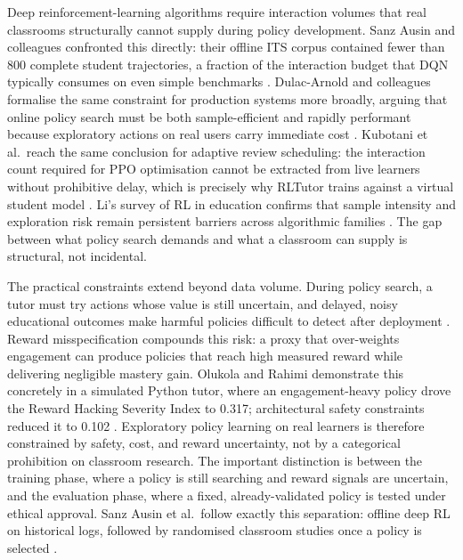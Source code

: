 Deep reinforcement-learning algorithms require interaction volumes that real classrooms structurally cannot supply during policy development. Sanz Ausin and colleagues confronted this directly: their offline \ac{ITS} corpus contained fewer than 800 complete student trajectories, a fraction of the interaction budget that \ac{DQN} typically consumes on even simple benchmarks \cite{sanz_ausin_leveraging_2019}. Dulac-Arnold and colleagues formalise the same constraint for production systems more broadly, arguing that online policy search must be both sample-efficient and rapidly performant because exploratory actions on real users carry immediate cost \cite{dulacarnold_challenges_2021}. Kubotani et al.\ reach the same conclusion for adaptive review scheduling: the interaction count required for \ac{PPO} optimisation cannot be extracted from live learners without prohibitive delay, which is precisely why RLTutor trains against a virtual student model \cite{kubotani_rltutor_2021}. Li's survey of \ac{RL} in education confirms that sample intensity and exploration risk remain persistent barriers across algorithmic families \cite{li_reinforcement_2022}. The gap between what policy search demands and what a classroom can supply is structural, not incidental.

The practical constraints extend beyond data volume. During policy search, a tutor must try actions whose value is still uncertain, and delayed, noisy educational outcomes make harmful policies difficult to detect after deployment \cite{dulacarnold_challenges_2021}. Reward misspecification compounds this risk: a proxy that over-weights engagement can produce policies that reach high measured reward while delivering negligible mastery gain. Olukola and Rahimi demonstrate this concretely in a simulated Python tutor, where an engagement-heavy policy drove the Reward Hacking Severity Index to 0.317; architectural safety constraints reduced it to 0.102 \cite{olukola_pedagogical_2026}. Exploratory policy learning on real learners is therefore constrained by safety, cost, and reward uncertainty, not by a categorical prohibition on classroom research. The important distinction is between the training phase, where a policy is still searching and reward signals are uncertain, and the evaluation phase, where a fixed, already-validated policy is tested under ethical approval. Sanz Ausin et al.\ follow exactly this separation: offline deep \ac{RL} on historical logs, followed by randomised classroom studies once a policy is selected \cite{sanz_ausin_leveraging_2019}.

